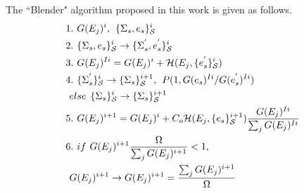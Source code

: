 \documentclass[twocolumn]{article}
\begin{document}
The ``Blender" algorithm proposed in this work  is given as follows. \\
\begin{equation}
\begin{split}
&1.\hspace{0.125cm} G(E_j)^i ,\hspace{0.15cm}  \{\Sigma_{s},e_s\}_{\mathcal{S}}^i\\
&2. \hspace{0.125cm}\{\Sigma_{s},e_s\}_{\mathcal{S}}^i \rightarrow  \{\Sigma_{s}^{'},e_s^{'}\}_{\mathcal{S}}^i\\
&3. \hspace{0.125cm}G(E_j)^{Ii} = G(E_j)^i + \mathcal{H}(E_j, \{e_{s}^{'}\}_{\mathcal{S}}^i) \\
&4. \hspace{0.125cm}\{\Sigma_{s}^{'}\}_{\mathcal{S}}^i \rightarrow \{\Sigma_{s}\}_{\mathcal{S}}^{i+1}, \hspace{0.15cm} P(1, G(e_s)^{Ii}/G(e_s^{'})^{Ii})\\
& \hspace{0.125cm}else  \hspace{0.15cm} \{\Sigma_{s}\}_{\mathcal{S}}^i \rightarrow \{\Sigma_{s}\}_{\mathcal{S}}^{i+1}\\
&5. \hspace{0.125cm} G(E_j)^{i+1} = G(E_j)^{i} + C_o\mathcal{H}(E_j, \{e_s\}_{\mathcal{S}}^{i+1})\frac{G(E_j)^{Ii}}{\sum_j G(E_j)^{Ii} }\\
&6. \hspace{0.125cm} if \hspace{0.125cm} G(E_j)^{i+1}\frac{\Omega}{\sum_j G(E_j)^{i+1}}  < 1, \\
& \hspace{0.125cm} G(E_j)^{i+1} \rightarrow G(E_j)^{i+1} = \frac{\sum_j G(E_j)^{i+1}}{\Omega}
\end{split}
\end{equation}
\end{document}
